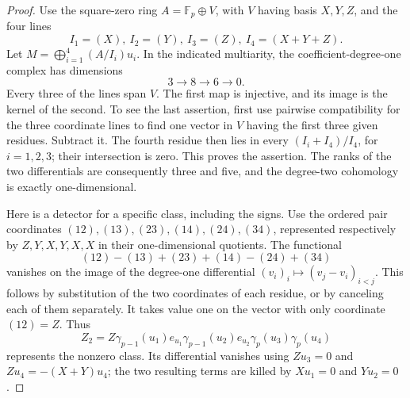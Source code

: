 \begin{proof}
Use the square-zero ring \(A=\mathbb F_p\oplus V\), with
\(V\) having basis \(X,Y,Z\), and the four lines
\[
 I_1=(X),\ I_2=(Y),\ I_3=(Z),\ I_4=(X+Y+Z).
                                                               \tag{EP.9}
\]
Let \(M=\bigoplus_{i=1}^4(A/I_i)u_i\).
In the indicated multiarity, the coefficient-degree-one
complex has dimensions
\[
                    3\longrightarrow8\longrightarrow6
                                      \longrightarrow0. \tag{EP.10}
\]
Every three of the lines span \(V\). The first map is
injective, and its image is the kernel of the second.
To see the last assertion, first use pairwise compatibility
for the three coordinate lines to find one vector in \(V\)
having the first three given residues. Subtract it. The fourth
residue then lies in every \((I_i+I_4)/I_4\), for
\(i=1,2,3\); their intersection is zero. This proves the
assertion. The ranks of the two differentials are consequently
three and five, and the degree-two cohomology is exactly
one-dimensional.

Here is a detector for a specific class, including the signs.
Use the ordered pair coordinates
\((12),(13),(23),(14),(24),(34)\), represented respectively
by \(Z,Y,X,Y,X,X\) in their one-dimensional quotients.
The functional
\[
                (12)-(13)+(23)+(14)-(24)+(34)            \tag{EP.11}
\]
vanishes on the image of the degree-one differential
\((v_i)_i\mapsto(v_j-v_i)_{i<j}\). This follows by
substitution of the two coordinates of each residue, or by
canceling each of them separately. It takes value one on
the vector with only coordinate \((12)=Z\). Thus
\[
 Z_2=Z\gamma_{p-1}(u_1)e_{u_1}
       \gamma_{p-1}(u_2)e_{u_2}\gamma_p(u_3)\gamma_p(u_4)
                                                               \tag{EP.12}
\]
represents the nonzero class. Its differential vanishes
using \(Zu_3=0\) and
\(Zu_4=-(X+Y)u_4\); the two resulting terms are killed
by \(Xu_1=0\) and \(Yu_2=0\).


\end{proof}
